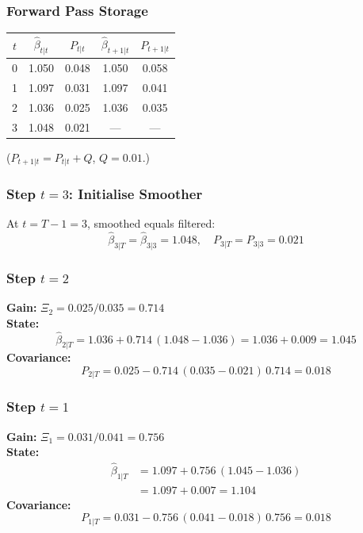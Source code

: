 \documentclass[10pt,a4paper,twocolumn]{article}
\begin{document}
\subsubsection{Forward Pass Storage}

\begin{center}\small
\begin{tabular}{@{}ccccc@{}}
\toprule
$t$ & $\hat\beta_{t|t}$ & $P_{t|t}$
    & $\hat\beta_{t+1|t}$ & $P_{t+1|t}$\\\midrule
0 & 1.050 & 0.048 & 1.050 & 0.058\\
1 & 1.097 & 0.031 & 1.097 & 0.041\\
2 & 1.036 & 0.025 & 1.036 & 0.035\\
3 & 1.048 & 0.021 & ---   & ---\\
\bottomrule
\end{tabular}
\end{center}
\noindent($P_{t+1|t} = P_{t|t} + Q$,\; $Q = 0.01$.)

\subsubsection{Step $t=3$: Initialise Smoother}

\begin{tcolorbox}[exbox={Boundary Condition}]
At $t = T-1 = 3$, smoothed equals filtered:
\[
  \hat\beta_{3|T} = \hat\beta_{3|3} = 1.048,
  \quad P_{3|T} = P_{3|3} = 0.021
\]
\end{tcolorbox}

\subsubsection{Step $t=2$}

\begin{tcolorbox}[exbox={Backward Step at {$t=2$}}]
\textbf{Gain:} $\Xi_2 = 0.025 / 0.035 = 0.714$\\[3pt]
\textbf{State:}
\[
  \hat\beta_{2|T} = 1.036 + 0.714\,(1.048 - 1.036)
                  = 1.036 + 0.009 = 1.045
\]
\textbf{Covariance:}
\[
  P_{2|T} = 0.025 - 0.714\,(0.035 - 0.021)\,0.714 = 0.018
\]
\end{tcolorbox}

\subsubsection{Step $t=1$}

\begin{tcolorbox}[exbox={Backward Step at {$t=1$}}]
\textbf{Gain:} $\Xi_1 = 0.031 / 0.041 = 0.756$\\[3pt]
\textbf{State:}
\begin{align*}
  \hat\beta_{1|T} &= 1.097 + 0.756\,(1.045 - 1.036)\\
                  &= 1.097 + 0.007 = 1.104
\end{align*}
\textbf{Covariance:}
\[
  P_{1|T} = 0.031 - 0.756\,(0.041 - 0.018)\,0.756 = 0.018
\]
\end{tcolorbox}
\end{document}
